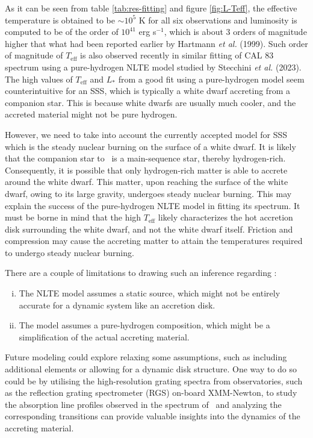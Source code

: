     As it can be seen from table \ref{tab:res-fitting} and figure \ref{fig:L-Teff}, the effective temperature is obtained to be $\sim 10^5$ K for all six observations and luminosity is computed to be of the order of $10^{41}$ erg s$^{-1}$, which is about 3 orders of magnitude higher that what had been reported earlier by Hartmann \textit{et al.} (1999). %
    Such order of magnitude of $T_\text{eff}$ is also observed recently in similar fitting of CAL 83 spectrum using a pure-hydrogen NLTE model studied by Stecchini \textit{et al.} (2023). %
    The high values of $T_\text{eff}$ and $L_*$ from a good fit using a pure-hydrogen model seem counterintuitive for an SSS, which is typically a white dwarf accreting from a companion star. This is because white dwarfs are usually much cooler, and the accreted material might not be pure hydrogen.
    
    However, we need to take into account the currently accepted model for SSS which is the steady nuclear burning on the surface of a white dwarf. It is likely that the companion star to \source\ is a main-sequence star, thereby hydrogen-rich. Consequently, it is possible that only hydrogen-rich matter is able to accrete around the white dwarf. This matter, upon reaching the surface of the white dwarf, owing to its large gravity, undergoes steady nuclear burning. This may explain the success of the pure-hydrogen NLTE model in fitting its spectrum. It must be borne in mind that the high $T_\text{eff}$ likely characterizes the hot accretion disk surrounding the white dwarf, and not the white dwarf itself. Friction and compression may cause the accreting matter to attain the temperatures required to undergo steady nuclear burning.
    
    There are a couple of limitations to drawing such an inference regarding \source:
    \begin{enumerate}[i.]
    	\item The NLTE model assumes a static source, which might not be entirely accurate for a dynamic system like an accretion disk.
    	\item The model assumes a pure-hydrogen composition, which might be a simplification of the actual accreting material.
    \end{enumerate}
    
    Future modeling could explore relaxing some assumptions, such as including additional elements or allowing for a dynamic disk structure. One way to do so could be by utilising the high-resolution grating spectra from observatories, such as the reflection grating spectrometer (RGS) on-board XMM-Newton, to study the absorption line profiles observed in the spectrum of \source\ and analyzing the corresponding transitions can provide valuable insights into the dynamics of the accreting material.
    
